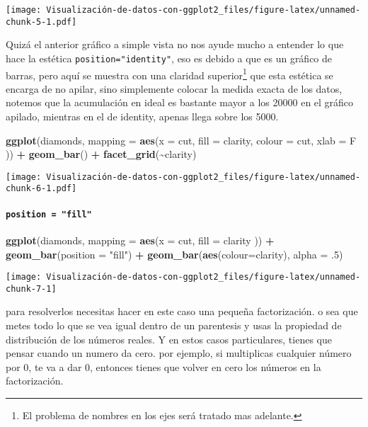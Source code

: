 \documentclass[
]{article}
\newenvironment{Shaded}{\begin{snugshade}}{\end{snugshade}}
\newcommand{\DataTypeTok}[1]{\textcolor[rgb]{0.13,0.29,0.53}{#1}}
\newcommand{\FloatTok}[1]{\textcolor[rgb]{0.00,0.00,0.81}{#1}}
\newcommand{\KeywordTok}[1]{\textcolor[rgb]{0.13,0.29,0.53}{\textbf{#1}}}
\newcommand{\NormalTok}[1]{#1}
\newcommand{\OperatorTok}[1]{\textcolor[rgb]{0.81,0.36,0.00}{\textbf{#1}}}
\newcommand{\StringTok}[1]{\textcolor[rgb]{0.31,0.60,0.02}{#1}}
\begin{document}
\texttt{[image: Visualización-de-datos-con-ggplot2\_files/figure-latex/unnamed-chunk-5-1.pdf]}

Quizá el anterior gráfico a simple vista no nos ayude mucho a entender
lo que hace la estética \texttt{position="identity"}, eso es debido a
que es un gráfico de barras, pero aquí se muestra con una claridad
superior\footnote{El problema de nombres en los ejes será tratado mas
  adelante.} que esta estética se encarga de no apilar, sino simplemente
colocar la medida exacta de los datos, notemos que la acumulación en
ideal es bastante mayor a los 20000 en el gráfico apilado, mientras en
el de identity, apenas llega sobre los 5000.

\begin{Shaded}
\begin{Highlighting}[]
\KeywordTok{ggplot}\NormalTok{(diamonds, }\DataTypeTok{mapping =} \KeywordTok{aes}\NormalTok{(}\DataTypeTok{x =}\NormalTok{ cut, }\DataTypeTok{fill =}\NormalTok{ clarity, }\DataTypeTok{colour =}\NormalTok{ cut, }\DataTypeTok{xlab =}\NormalTok{ F )) }\OperatorTok{+}
\StringTok{  }\KeywordTok{geom\_bar}\NormalTok{() }\OperatorTok{+}
\StringTok{  }\KeywordTok{facet\_grid}\NormalTok{(}\OperatorTok{\textasciitilde{}}\NormalTok{clarity)}
\end{Highlighting}
\end{Shaded}

\texttt{[image: Visualización-de-datos-con-ggplot2\_files/figure-latex/unnamed-chunk-6-1.pdf]}

\hypertarget{position-fill}{%
\paragraph{\texorpdfstring{\texttt{position\ =\ "fill"}}{position = "fill"}}\label{position-fill}}

\begin{Shaded}
\begin{Highlighting}[]
\KeywordTok{ggplot}\NormalTok{(diamonds, }\DataTypeTok{mapping =} \KeywordTok{aes}\NormalTok{(}\DataTypeTok{x =}\NormalTok{ cut, }\DataTypeTok{fill =}\NormalTok{ clarity )) }\OperatorTok{+}
\StringTok{  }\KeywordTok{geom\_bar}\NormalTok{(}\DataTypeTok{position =} \StringTok{"fill"}\NormalTok{) }\OperatorTok{+}
\StringTok{  }\KeywordTok{geom\_bar}\NormalTok{(}\KeywordTok{aes}\NormalTok{(}\DataTypeTok{colour=}\NormalTok{clarity), }\DataTypeTok{alpha =} \FloatTok{.5}\NormalTok{) }
\end{Highlighting}
\end{Shaded}

\begin{center}\texttt{[image: Visualización-de-datos-con-ggplot2\_files/figure-latex/unnamed-chunk-7-1]} \end{center}

para resolverlos necesitas hacer en este caso una pequeña factorización.
o sea que metes todo lo que se vea igual dentro de un parentesis y usas
la propiedad de distribución de los números reales. Y en estos casos
particulares, tienes que pensar cuando un numero da cero. por ejemplo,
si multiplicas cualquier número por 0, te va a dar 0, entonces tienes
que volver en cero los números en la factorización.
\end{document}
